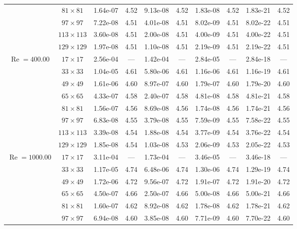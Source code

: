 \documentclass[preprint, 12pt]{elsarticle}
\begin{document}
\begin{center}
\begin{table}[H]
{\begin{tabular*}{\textwidth}{@{\extracolsep\fill}cccccccccc@{}}
    & $81\times 81$ & 1.64e-07 & 4.52 & 9.13e-08 & 4.52 & 1.83e-08 & 4.52 & 1.83e-21 & 4.52 \\
    & $97\times 97$ & 7.22e-08 & 4.51 & 4.01e-08 & 4.51 & 8.02e-09 & 4.51 & 8.02e-22 & 4.51 \\
    & $113\times 113$ & 3.60e-08 & 4.51 & 2.00e-08 & 4.51 & 4.00e-09 & 4.51 & 4.00e-22 & 4.51 \\
    & $129\times 129$ & 1.97e-08 & 4.51 & 1.10e-08 & 4.51 & 2.19e-09 & 4.51 & 2.19e-22 & 4.51 \\
    \hline
    \multirow{7}{*}{$\operatorname{Re}=400.00$} & $17\times 17$ & 2.56e-04 & --- & 1.42e-04 & --- & 2.84e-05 & --- & 2.84e-18 & --- \\
    & $33\times 33$ & 1.04e-05 & 4.61 & 5.80e-06 & 4.61 & 1.16e-06 & 4.61 & 1.16e-19 & 4.61 \\
    & $49\times 49$ & 1.61e-06 & 4.60 & 8.97e-07 & 4.60 & 1.79e-07 & 4.60 & 1.79e-20 & 4.60 \\
    \multirow{3}{*}{$\operatorname{Wi}=5$} & $65\times 65$ & 4.33e-07 & 4.58 & 2.40e-07 & 4.58 & 4.81e-08 & 4.58 & 4.81e-21 & 4.58 \\
    & $81\times 81$ & 1.56e-07 & 4.56 & 8.69e-08 & 4.56 & 1.74e-08 & 4.56 & 1.74e-21 & 4.56 \\
    & $97\times 97$ & 6.83e-08 & 4.55 & 3.79e-08 & 4.55 & 7.59e-09 & 4.55 & 7.58e-22 & 4.55 \\
    & $113\times 113$ & 3.39e-08 & 4.54 & 1.88e-08 & 4.54 & 3.77e-09 & 4.54 & 3.76e-22 & 4.54 \\
    & $129\times 129$ & 1.85e-08 & 4.54 & 1.03e-08 & 4.53 & 2.06e-09 & 4.53 & 2.05e-22 & 4.53 \\
    \hline
    \multirow{7}{*}{$\operatorname{Re}=1000.00$} & $17\times 17$ & 3.11e-04 & --- & 1.73e-04 & --- & 3.46e-05 & --- & 3.46e-18 & --- \\
    & $33\times 33$ & 1.17e-05 & 4.74 & 6.48e-06 & 4.74 & 1.30e-06 & 4.74 & 1.29e-19 & 4.74 \\
    & $49\times 49$ & 1.72e-06 & 4.72 & 9.56e-07 & 4.72 & 1.91e-07 & 4.72 & 1.91e-20 & 4.72 \\
    \multirow{3}{*}{$\operatorname{Wi}=5$} & $65\times 65$ & 4.50e-07 & 4.66 & 2.50e-07 & 4.66 & 5.00e-08 & 4.66 & 5.00e-21 & 4.66 \\
    & $81\times 81$ & 1.60e-07 & 4.62 & 8.92e-08 & 4.62 & 1.78e-08 & 4.62 & 1.78e-21 & 4.62 \\
    & $97\times 97$ & 6.94e-08 & 4.60 & 3.85e-08 & 4.60 & 7.71e-09 & 4.60 & 7.70e-22 & 4.60 \\

\end{tabular*}}
\end{table}
\end{center}
\end{document}
